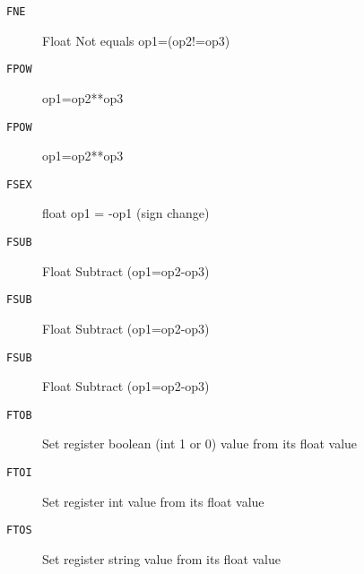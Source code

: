 \begin{description}
\item[\texttt{FNE}]  Float Not equals op1=(op2!=op3)\\

\end{description}
\begin{description}
\item[\texttt{FPOW}]  op1=op2**op3\\

\end{description}
\begin{description}
\item[\texttt{FPOW}]  op1=op2**op3\\

\end{description}
\begin{description}
\item[\texttt{FSEX}]  float op1 = -op1 (sign change)\\

\end{description}
\begin{description}
\item[\texttt{FSUB}]  Float Subtract (op1=op2-op3)\\

\end{description}
\begin{description}
\item[\texttt{FSUB}]  Float Subtract (op1=op2-op3)\\

\end{description}
\begin{description}
\item[\texttt{FSUB}]  Float Subtract (op1=op2-op3)\\

\end{description}
\begin{description}
\item[\texttt{FTOB}]  Set register boolean (int 1 or 0) value from its float value\\

\end{description}
\begin{description}
\item[\texttt{FTOI}]  Set register int value from its float value\\

\end{description}
\begin{description}
\item[\texttt{FTOS}]  Set register string value from its float value\\

\end{description}
